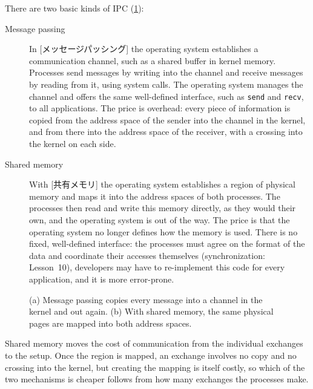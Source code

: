 \documentclass[../main.tex]{subfiles}
\begin{document}
There are two basic kinds of IPC (\cref{fig:l02-ipc}):
\begin{description}
  \item[Message passing] In [メッセージパッシング]
    the operating system establishes a communication channel, such as a
    shared buffer in kernel memory.  Processes send messages by writing into
    the channel and receive messages by reading from it, using system calls.
    The operating system manages the channel and offers the same
    well-defined interface, such as \texttt{send} and \texttt{recv}, to all
    applications.  The price is overhead: every piece of information is
    copied from the address space of the sender into the channel in the
    kernel, and from there into the address space of the receiver, with a
    crossing into the kernel on each side.
  \item[Shared memory] With [共有メモリ] the operating
    system establishes a region of physical memory and maps it into the
    address spaces of both processes.  The processes then read and write
    this memory directly, as they would their own, and the operating system
    is out of the way.  The price is that the operating system no longer
    defines how the memory is used.  There is no fixed, well-defined
    interface: the processes must agree on the format of the data and
    coordinate their accesses themselves (synchronization: Lesson~10),
    developers may have to
    re-implement this code for every application, and it is more
    error-prone.
\end{description}

\begin{figure}[htbp]
  \centering
  
  \caption{(a) Message passing copies every message into a channel in the
    kernel and out again.  (b) With shared memory, the same physical pages
    are mapped into both address spaces.}
  \label{fig:l02-ipc}
\end{figure}

Shared memory moves the cost of communication from the individual exchanges
to the setup.  Once the region is
mapped, an exchange involves no copy and no crossing into the kernel, but
creating the mapping is itself costly, so which of the two mechanisms is
cheaper follows from how many exchanges the processes make.
\end{document}
